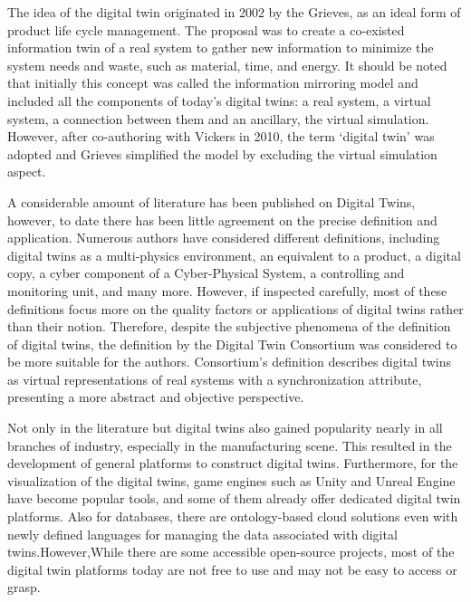 \documentclass[conference]{IEEEtran}
\begin{document}
    The idea of the digital twin originated in 2002 by the Grieves, as an ideal form of product life cycle management. 
    The proposal was to create a co-existed information twin of a real system to gather new information to minimize 
    the system needs and waste, such as material, time, and energy. It should be noted that initially this concept was 
    called the information mirroring model and included all the components of today's digital twins: a real system, 
    a virtual system, a connection between them and an ancillary, the virtual simulation. However, after co-authoring with Vickers in 2010, 
    the term `digital twin' was adopted and Grieves simplified the model by excluding the virtual simulation aspect.
    
    A considerable amount of literature has been published on Digital Twins, however, to date there has been little agreement on the precise definition and application. Numerous authors have considered different 
    definitions, including digital twins as a multi-physics environment, an equivalent to a product,
    a digital copy, a cyber component of a Cyber-Physical System, a controlling and monitoring unit,
    and many more. However, if inspected carefully, most of these definitions focus more on the quality 
    factors or applications of digital twins rather than their notion.
    Therefore, despite the subjective phenomena of the definition of digital twins,
    the definition by the Digital Twin Consortium was considered to be more suitable for the authors. 
    Consortium's definition describes digital twins as virtual representations of real systems with 
    a synchronization attribute, presenting a more abstract and objective perspective.\cite{asf}

    Not only in the literature but digital twins also gained popularity nearly in all branches
    of industry, especially in the manufacturing scene.  
    This resulted in the development of general platforms to construct digital twins. 
    Furthermore, for the visualization of the digital twins, 
    game engines such as Unity and  Unreal Engine have become popular tools, 
    and some of them already offer dedicated digital twin platforms. Also for databases,
    there are ontology-based cloud solutions even with newly defined languages for 
    managing the data associated with digital twins.However,While there are some accessible open-source projects, 
    most of the digital twin platforms today are not free to use and may not be easy to access or grasp. 
\end{document}
